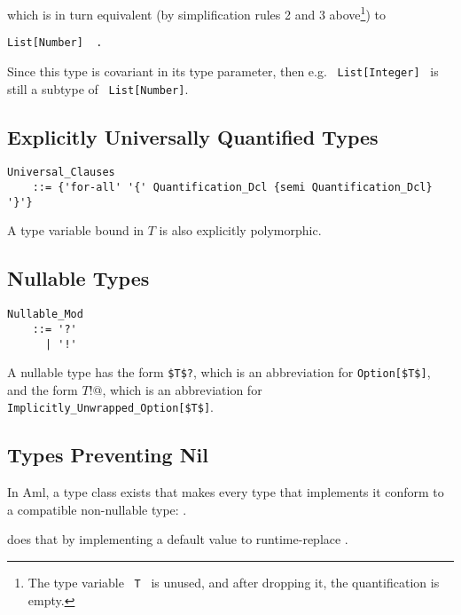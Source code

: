which is in turn equivalent (by simplification rules 2 and 3 above\footnote{The type variable ~\lstinline!T!~ is unused, and after dropping it, the quantification is empty.}) to
\begin{lstlisting}
List[Number]  .
\end{lstlisting}

Since this  type is covariant in its type parameter, then e.g. ~\lstinline!List[Integer]!~ is still a subtype of ~\lstinline!List[Number]!. 





\subsection{Explicitly Universally Quantified Types}
\label{sec:universal-types}

\grammar\begin{lstlisting}
Universal_Clauses 
    ::= {'for-all' '{' Quantification_Dcl {semi Quantification_Dcl} '}'}
\end{lstlisting}

A type variable bound in $T$ is also explicitly polymorphic. 





\subsection{Nullable Types}
\label{sec:nullable-types}

\grammar\begin{lstlisting}
Nullable_Mod 
    ::= '?' 
      | '!'
\end{lstlisting}

A nullable type has the form \lstinline!$T$?!, which is an abbreviation for \lstinline!Option[$T$]!, and the form \lstinline@$T$!@, which is an abbreviation for \lstinline!Implicitly_Unwrapped_Option[$T$]!.





\subsection{Types Preventing Nil}
\label{sec:types-preventing-nil}

In Aml, a type class exists that makes every type that implements it conform to a compatible non-nullable type: . 

 does that by implementing a default value to runtime-replace . 

